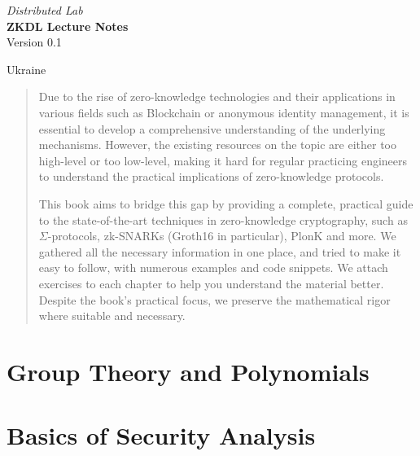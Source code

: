 \documentclass{zkdl-template}
\def\maketitle{
    \begin{center}
        {\Large\sffamily \emph{Distributed Lab}} \\ \vspace{30mm}
        {\huge\sffamily\bfseries ZKDL Lecture Notes} \\ \vspace{5mm}
        {Version 0.1} \\ \vspace{10mm}
    \end{center}
    
    \vfill

    \begin{center}
        {Ukraine} \\ \vspace{2mm}
        {\sffamily \the\year}
    \end{center}

    \thispagestyle{empty}
    \pagebreak
}
\begin{document}
    \maketitle

    \pagecolor{white}
    
    \begin{abstract}
        \fontsize{10}{12}\selectfont
        Due to the rise of zero-knowledge technologies and their applications in
        various fields such as Blockchain or anonymous identity management, it is
        essential to develop a comprehensive understanding of the underlying
        mechanisms. However, the existing resources on the topic are either too
        high-level or too low-level, making it hard for regular practicing engineers
        to understand the practical implications of zero-knowledge protocols.
    
        This book aims to bridge this gap by providing a complete, practical guide
        to the state-of-the-art techniques in zero-knowledge cryptography, such as
        $\Sigma$-protocols, zk-SNARKs (Groth16 in particular), PlonK and more. We
        gathered all the necessary information in one place, and tried to make it
        easy to follow, with numerous examples and code snippets. We attach
        exercises to each chapter to help you understand the material better.
        Despite the book's practical focus, we preserve the mathematical rigor where
        suitable and necessary.
    \end{abstract}
    
    \thispagestyle{empty}
    \newpage

    \pagestyle{fancy}
    \pagecolor{white}

    \tableofcontents

\pagebreak


\section{Group Theory and Polynomials}



\section{Basics of Security Analysis}\label{section:math-crypto-2}


\end{document}
